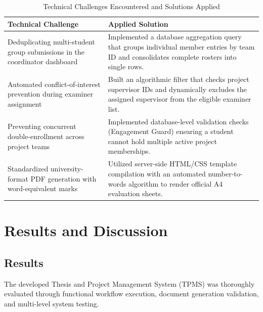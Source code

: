 \documentclass[12pt,a4paper]{report}
\begin{document}
\begin{table}[H]
\centering
\caption{Technical Challenges Encountered and Solutions Applied}
\label{tab:challenges}
\vspace{4pt}
\small
\begin{tabularx}{\textwidth}{@{}p{4.5cm} X@{}}
\toprule
\textbf{Technical Challenge} & \textbf{Applied Solution} \\
\midrule
Deduplicating multi-student group submissions in the coordinator dashboard & Implemented a database aggregation query that groups individual member entries by team ID and consolidates complete rosters into single rows. \\
\addlinespace
Automated conflict-of-interest prevention during examiner assignment & Built an algorithmic filter that checks project supervisor IDs and dynamically excludes the assigned supervisor from the eligible examiner list. \\
\addlinespace
Preventing concurrent double-enrollment across project teams & Implemented database-level validation checks (Engagement Guard) ensuring a student cannot hold multiple active project memberships. \\
\addlinespace
Standardized university-format PDF generation with word-equivalent marks & Utilized server-side HTML/CSS template compilation with an automated number-to-words algorithm to render official A4 evaluation sheets. \\
\bottomrule
\end{tabularx}
\end{table}

\chapter{Results and Discussion}

\section{Results}
The developed Thesis and Project Management System (TPMS) was thoroughly evaluated through functional workflow execution, document generation validation, and multi-level system testing.
\end{document}
